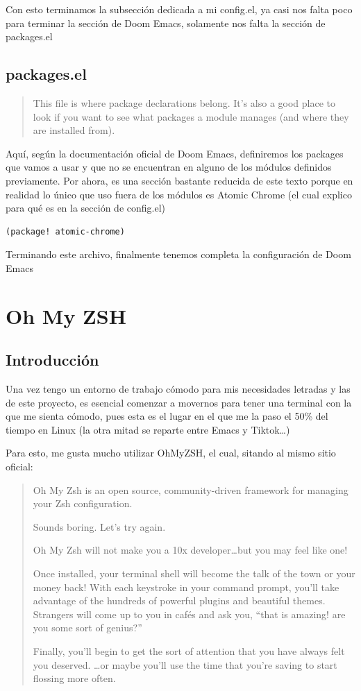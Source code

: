 \documentclass[11pt]{article}
\begin{document}
Con esto terminamos la subsección dedicada a mi config.el, ya casi nos falta poco para terminar la sección de Doom Emacs, solamente nos falta la sección de packages.el
\subsection{packages.el}
\label{sec:org017e531}

\begin{quote}
This file is where package declarations belong. It’s also a good place to look if you want to see what packages a module manages (and where they are installed from).
\end{quote}

Aquí, según la documentación oficial de Doom Emacs, definiremos los packages que vamos a usar y que no se encuentran en alguno de los módulos definidos previamente. Por ahora, es una sección bastante reducida de este texto porque en realidad lo único que uso fuera de los módulos es Atomic Chrome (el cual explico para qué es en la sección de config.el)

\begin{verbatim}
(package! atomic-chrome)
\end{verbatim}


Terminando este archivo, finalmente tenemos completa la configuración de Doom Emacs
\section{Oh My ZSH}
\label{sec:orgcc12621}

\subsection{Introducción}
\label{sec:org0f7bd8e}

Una vez tengo un entorno de trabajo cómodo para mis necesidades letradas y las de este proyecto, es esencial comenzar a movernos para tener una terminal con la que me sienta cómodo, pues esta es el lugar en el que me la paso el 50\% del tiempo en Linux (la otra mitad se reparte entre Emacs y Tiktok\ldots{})

Para esto, me gusta mucho utilizar OhMyZSH, el cual, sitando al mismo sitio oficial:

\begin{quote}
Oh My Zsh is an open source, community-driven framework for managing your Zsh configuration.

Sounds boring. Let's try again.

Oh My Zsh will not make you a 10x developer\ldots{}but you may feel like one!

Once installed, your terminal shell will become the talk of the town or your money back! With each keystroke in your command prompt, you'll take advantage of the hundreds of powerful plugins and beautiful themes. Strangers will come up to you in cafés and ask you, ``that is amazing! are you some sort of genius?''

Finally, you'll begin to get the sort of attention that you have always felt you deserved. \ldots{}or maybe you'll use the time that you're saving to start flossing more often. 😬
\end{quote}
\end{document}
